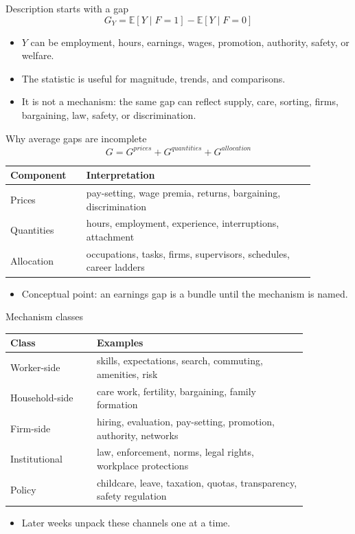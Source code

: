 \documentclass[aspectratio=169,11pt]{beamer}
\begin{document}
\begin{frame}{Description starts with a gap}
\[
G_Y = \mathbb{E}[Y \mid F=1] - \mathbb{E}[Y \mid F=0]
\]
\begin{itemize}
    \item $Y$ can be employment, hours, earnings, wages, promotion, authority, safety, or welfare.
    \item The statistic is useful for magnitude, trends, and comparisons.
    \item It is not a mechanism: the same gap can reflect supply, care, sorting, firms, bargaining, law, safety, or discrimination.
\end{itemize}
\end{frame}

\begin{frame}{Why average gaps are incomplete}
\[
G = G^{prices} + G^{quantities} + G^{allocation}
\]
\small
\begin{tabular}{p{0.22\linewidth} p{0.66\linewidth}}
\toprule
Component & Interpretation \\
\midrule
Prices & pay-setting, wage premia, returns, bargaining, discrimination \\
Quantities & hours, employment, experience, interruptions, attachment \\
Allocation & occupations, tasks, firms, supervisors, schedules, career ladders \\
\bottomrule
\end{tabular}
\vspace{0.4cm}
\begin{itemize}
    \item Conceptual point: an earnings gap is a bundle until the mechanism is named.
\end{itemize}
\end{frame}

\begin{frame}{Mechanism classes}
\small
\begin{tabular}{p{0.25\linewidth} p{0.61\linewidth}}
\toprule
Class & Examples \\
\midrule
Worker-side & skills, expectations, search, commuting, amenities, risk \\
Household-side & care work, fertility, bargaining, family formation \\
Firm-side & hiring, evaluation, pay-setting, promotion, authority, networks \\
Institutional & law, enforcement, norms, legal rights, workplace protections \\
Policy & childcare, leave, taxation, quotas, transparency, safety regulation \\
\bottomrule
\end{tabular}
\vspace{0.4cm}
\begin{itemize}
    \item Later weeks unpack these channels one at a time.
\end{itemize}
\end{frame}
\end{document}
